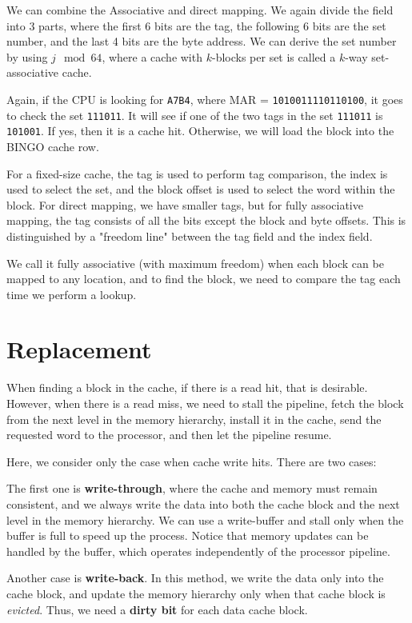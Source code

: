 We can combine the Associative and direct mapping. We again divide the field into 3 parts, where the first 6 bits are the tag, the following 6 bits are the set number, and the last 4 bits are the byte address. We can derive the set number by using \(j \mod 64\), where a cache with \(k\)-blocks per set is called a \(k\)-way set-associative cache.

Again, if the CPU is looking for \verb|A7B4|, where MAR = \verb|1010011110110100|, it goes to check the set \verb|111011|. It will see if one of the two tags in the set \verb|111011| is \verb|101001|. If yes, then it is a cache hit. Otherwise, we will load the block into the BINGO cache row.

For a fixed-size cache, the tag is used to perform tag comparison, the index is used to select the set, and the block offset is used to select the word within the block. For direct mapping, we have smaller tags, but for fully associative mapping, the tag consists of all the bits except the block and byte offsets. This is distinguished by a "freedom line" between the tag field and the index field.

We call it fully associative (with maximum freedom) when each block can be mapped to any location, and to find the block, we need to compare the tag each time we perform a lookup.

\section{Replacement}
When finding a block in the cache, if there is a read hit, that is desirable. However, when there is a read miss, we need to stall the pipeline, fetch the block from the next level in the memory hierarchy, install it in the cache, send the requested word to the processor, and then let the pipeline resume.

Here, we consider only the case when cache write hits. There are two cases:

The first one is \textbf{write-through}, where the cache and memory must remain consistent, and we always write the data into both the cache block and the next level in the memory hierarchy. We can use a write-buffer and stall only when the buffer is full to speed up the process. Notice that memory updates can be handled by the buffer, which operates independently of the processor pipeline.

Another case is \textbf{write-back}. In this method, we write the data only into the cache block, and update the memory hierarchy only when that cache block is \textit{evicted}. Thus, we need a \textbf{dirty bit} for each data cache block.

